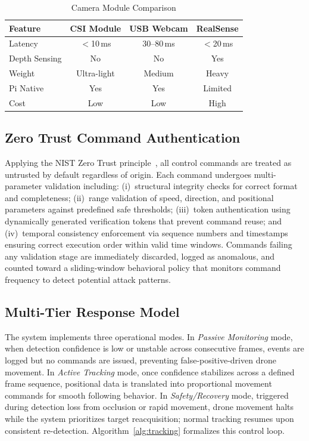 \documentclass[conference]{IEEEtran}
\begin{document}
\begin{table}[!t]
\centering
\caption{Camera Module Comparison}
\label{tab:camera}
\begin{tabular}{lccc}
\toprule
\textbf{Feature} & \textbf{CSI Module} & \textbf{USB Webcam} & \textbf{RealSense} \\
\midrule
Latency        & $<$10\,ms & 30--80\,ms & $<$20\,ms \\
Depth Sensing  & No        & No          & Yes        \\
Weight          & Ultra-light & Medium    & Heavy      \\
Pi Native       & Yes        & Yes         & Limited    \\
Cost            & Low        & Low         & High       \\
\bottomrule
\end{tabular}
\end{table}

\subsection{Zero Trust Command Authentication}

Applying the NIST Zero Trust principle~\cite{nist_zt}, all control commands are treated as untrusted by default regardless of origin. Each command undergoes multi-parameter validation including: (i)~structural integrity checks for correct format and completeness; (ii)~range validation of speed, direction, and positional parameters against predefined safe thresholds; (iii)~token authentication using dynamically generated verification tokens that prevent command reuse; and (iv)~temporal consistency enforcement via sequence numbers and timestamps ensuring correct execution order within valid time windows. Commands failing any validation stage are immediately discarded, logged as anomalous, and counted toward a sliding-window behavioral policy that monitors command frequency to detect potential attack patterns.

\subsection{Multi-Tier Response Model}

The system implements three operational modes. In \textit{Passive Monitoring} mode, when detection confidence is low or unstable across consecutive frames, events are logged but no commands are issued, preventing false-positive-driven drone movement. In \textit{Active Tracking} mode, once confidence stabilizes across a defined frame sequence, positional data is translated into proportional movement commands for smooth following behavior. In \textit{Safety/Recovery} mode, triggered during detection loss from occlusion or rapid movement, drone movement halts while the system prioritizes target reacquisition; normal tracking resumes upon consistent re-detection. Algorithm~\ref{alg:tracking} formalizes this control loop.
\end{document}
